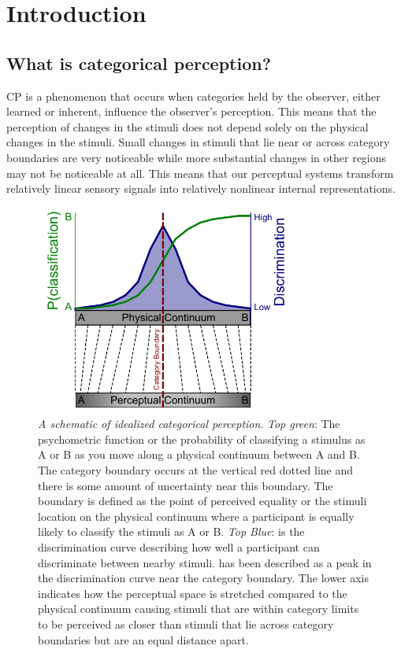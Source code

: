 \chapter*{Introduction}
\section{What is categorical perception?}

\acf{CP} is a phenomenon that occurs when categories held by the observer, either learned or inherent, influence the observer’s perception. This means that the perception of changes in the stimuli does not depend solely on the physical changes in the stimuli. Small changes in stimuli that lie near or across category boundaries are very noticeable while more substantial changes in other regions may not be noticeable at all. This means that our perceptual systems transform relatively linear sensory signals into relatively nonlinear internal representations.

\begin{figure}[hp] 
  \centering
  \includegraphics[width=0.75\textwidth]{figures/cp_def.pdf}
  \caption[A schematic of idealized categorical perception]
{\emph{A schematic of idealized categorical perception}. \emph{Top green}: The psychometric function or the probability of classifying a stimulus as A or B as you move along a physical continuum between A and B. The category boundary occurs at the vertical red dotted line and there is some amount of uncertainty near this boundary. The boundary is defined as the point of perceived equality or the stimuli location on the physical continuum where a participant is equally likely to classify the stimuli as A or B. \emph{Top Blue}: is the discrimination curve describing how well a participant can discriminate between nearby stimuli. \CP has been described as a peak in the discrimination curve near the category boundary. The lower axis indicates how the perceptual space is stretched compared to the physical continuum causing stimuli that are within category limits to be perceived as closer than stimuli that lie across category boundaries but are an equal distance apart.}
  \label{fig:cpdef}
\end{figure}

